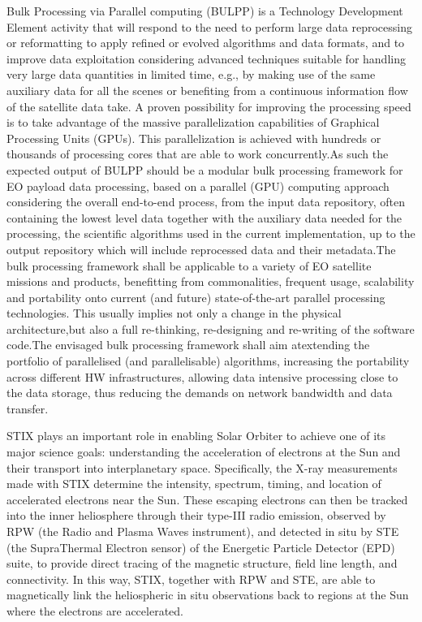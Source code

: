 \documentclass[preprint,11pt]{elsarticle}
\begin{document}
Bulk Processing via Parallel computing (BULPP) is a Technology Development 
Element activity that will respond to the need to perform large data 
reprocessing or reformatting to apply refined or evolved algorithms and data 
formats, and to improve data exploitation considering advanced techniques 
suitable for handling very large data quantities in limited time, e.g., by 
making use of the same auxiliary data for all the scenes or benefiting from a 
continuous information flow of the satellite data take. A proven possibility 
for improving the processing speed is to take advantage of the massive 
parallelization capabilities of Graphical Processing Units (GPUs). This 
parallelization is achieved with hundreds or thousands of processing cores 
that are able to work concurrently.As such the expected output of BULPP should 
be a modular bulk processing framework for EO payload data processing, based 
on a parallel (GPU) computing approach considering the overall end-to-end 
process, from the input data repository, often containing the lowest level 
data together with the auxiliary data needed for the processing, the 
scientific algorithms used in the current implementation, up to the output 
repository which will include reprocessed data and their metadata.The bulk 
processing framework shall be applicable to a variety of EO satellite missions 
and products, benefitting from commonalities, frequent usage, scalability and 
portability onto current (and future) state-of-the-art parallel processing 
technologies. This usually implies not only a change in the physical 
architecture,but also a full re-thinking, re-designing and re-writing of the 
software code.The envisaged bulk processing framework shall aim atextending 
the portfolio of parallelised (and parallelisable) algorithms, increasing the 
portability across different HW infrastructures, allowing data intensive 
processing close to the data storage, thus reducing the demands on network 
bandwidth and data transfer.
 
 
 STIX plays an important role in enabling Solar Orbiter to achieve one of its major science
goals: understanding the acceleration of electrons at the Sun and their transport into
interplanetary space. Specifically, the X-ray measurements made with STIX determine the
intensity, spectrum, timing, and location of accelerated electrons near the Sun. These
escaping electrons can then be tracked into the inner heliosphere through their type-III radio
emission, observed by RPW (the Radio and Plasma Waves instrument), and detected in situ
by STE (the SupraThermal Electron sensor) of the Energetic Particle Detector (EPD) suite,
to provide direct tracing of the magnetic structure, field line length, and connectivity. In this
way, STIX, together with RPW and STE, are able to magnetically link the heliospheric in situ
observations back to regions at the Sun where the electrons are accelerated.
\end{document}
